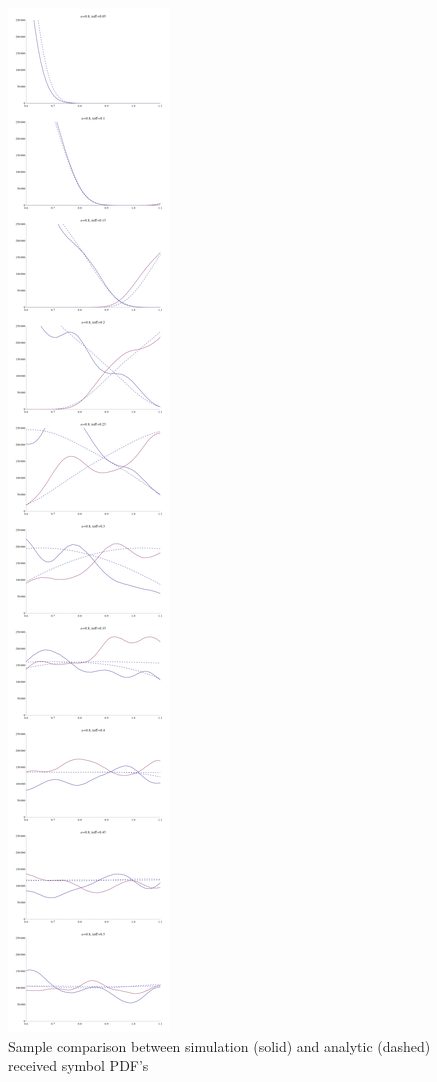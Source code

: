 \begin{figure}[htbp]
\centering
\includegraphics[height=\textheight]{../../../plots/comparison_f08_boundary.png}
\caption{Sample comparison between simulation (solid) and analytic
(dashed) received symbol PDF's}
\end{figure}

